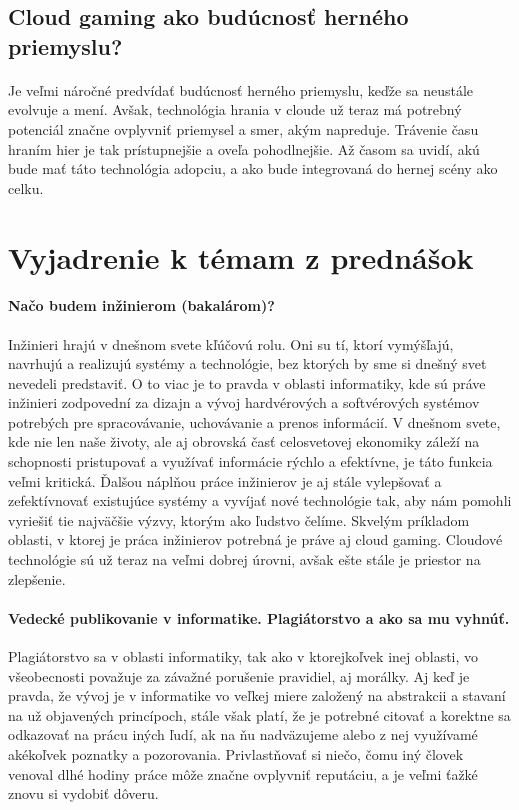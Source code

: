 \documentclass[10pt,twoside,slovak,a4paper]{article}
\begin{document}
\subsection{Cloud gaming ako budúcnosť herného priemyslu?}

\paragraph{} Je veľmi náročné predvídať budúcnosť herného priemyslu, keďže sa neustále evolvuje a mení. Avšak, technológia hrania v cloude už teraz má potrebný potenciál značne ovplyvniť priemysel a smer, akým napreduje. Trávenie času hraním hier je tak prístupnejšie a oveľa pohodlnejšie. Až časom sa uvidí, akú bude mať táto technológia adopciu, a ako bude integrovaná do hernej scény ako celku. \cite{7182690}



\section{Vyjadrenie k témam z prednášok}

\paragraph{Načo budem inžinierom (bakalárom)?} Inžinieri hrajú v dnešnom svete kľúčovú rolu. Oni su tí, ktorí vymýšľajú, navrhujú a realizujú systémy a technológie, bez ktorých by sme si dnešný svet nevedeli predstaviť. O to viac je to pravda v oblasti informatiky, kde sú práve inžinieri zodpovední za dizajn a vývoj hardvérových a softvérových systémov potrebých pre spracovávanie, uchovávanie a prenos informácií. V dnešnom svete, kde nie len naše životy, ale aj obrovská časť celosvetovej ekonomiky záleží na schopnosti pristupovať a využívať informácie rýchlo a efektívne, je táto funkcia veľmi kritická. Ďalšou náplňou práce inžinierov je aj stále vylepšovať a zefektívnovať existujúce systémy a vyvíjať nové technológie tak, aby nám pomohli vyriešiť tie najväčšie výzvy, ktorým ako ľudstvo čelíme. Skvelým príkladom oblasti, v ktorej je práca inžinierov potrebná je práve aj cloud gaming. Cloudové technológie sú už teraz na veľmi dobrej úrovni, avšak ešte stále je priestor na zlepšenie.

\paragraph{Vedecké publikovanie v informatike. Plagiátorstvo a ako sa mu vyhnúť.} Plagiátorstvo sa v oblasti informatiky, tak ako v ktorejkoľvek inej oblasti, vo všeobecnosti považuje za závažné porušenie pravidiel, aj morálky. Aj keď je pravda, že vývoj je v informatike vo veľkej miere založený na abstrakcii a stavaní na už objavených princípoch, stále však platí, že je potrebné citovať a korektne sa odkazovať na prácu iných ľudí, ak na ňu nadväzujeme alebo z nej využívamé akékoľvek poznatky a pozorovania. Privlastňovať si niečo, čomu iný človek venoval dlhé hodiny práce môže značne ovplyvniť reputáciu, a je veľmi ťažké znovu si vydobiť dôveru.
\end{document}
